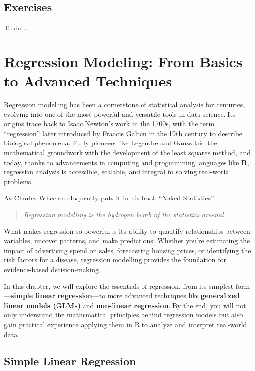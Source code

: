 \documentclass[
]{book}
\theoremstyle{definition}
\theoremstyle{definition}
\theoremstyle{definition}
\theoremstyle{definition}
\theoremstyle{remark}
\begin{document}
\section{Exercises}\label{exercises-4}

To do ..

\chapter{Regression Modeling: From Basics to Advanced Techniques}\label{chapter-regression}

Regression modelling has been a cornerstone of statistical analysis for centuries, evolving into one of the most powerful and versatile tools in data science. Its origins trace back to Isaac Newton's work in the 1700s, with the term ``regression'' later introduced by Francis Galton in the 19th century to describe biological phenomena. Early pioneers like Legendre and Gauss laid the mathematical groundwork with the development of the least squares method, and today, thanks to advancements in computing and programming languages like \textbf{R}, regression analysis is accessible, scalable, and integral to solving real-world problems.

As Charles Wheelan eloquently puts it in his book \href{https://www.goodreads.com/book/show/15786586-naked-statistics}{``Naked Statistics''}:

\begin{quote}
\emph{Regression modelling is the hydrogen bomb of the statistics arsenal.}
\end{quote}

What makes regression so powerful is its ability to quantify relationships between variables, uncover patterns, and make predictions. Whether you're estimating the impact of advertising spend on sales, forecasting housing prices, or identifying the risk factors for a disease, regression modelling provides the foundation for evidence-based decision-making.

In this chapter, we will explore the essentials of regression, from its simplest form---\textbf{simple linear regression}---to more advanced techniques like \textbf{generalized linear models (GLMs)} and \textbf{non-linear regression}. By the end, you will not only understand the mathematical principles behind regression models but also gain practical experience applying them in R to analyze and interpret real-world data.

\section{Simple Linear Regression}\label{sec-simple-regression}
\end{document}
